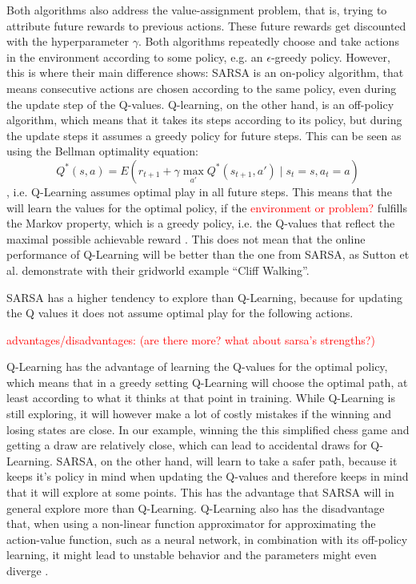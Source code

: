 \documentclass[conference]{IEEEtran}
\begin{document}
Both algorithms also address the value-assignment problem, that is, trying to attribute future rewards to previous actions. These future rewards get discounted with the hyperparameter $\gamma$. Both algorithms repeatedly choose and take actions in the environment according to some policy, e.g. an $\epsilon$-greedy policy. However, this is where their main difference shows: SARSA is an on-policy algorithm, that means consecutive actions are chosen according to the same policy, even during the update step of the Q-values. Q-learning, on the other hand, is an off-policy algorithm, which means that it takes its steps according to its policy, but during the update steps it assumes a greedy policy for future steps. This can be seen as using the Bellman optimality equation: $$Q^*(s,a) = E(r_{t+1} + \gamma \max_{a'} Q^*(s_{t+1}, a') \mid s_t=s, a_t=a)$$, i.e. Q-Learning assumes optimal play in all future steps. This means that the will learn the values for the optimal policy, if the \textcolor{red}{environment or problem?} fulfills the Markov property, which is a greedy policy, i.e. the Q-values that reflect the maximal possible achievable reward \cite{sutton2018}. This does not mean that the online performance of Q-Learning will be better than the one from SARSA, as Sutton et al. \cite{sutton2018} demonstrate with their gridworld example ``Cliff Walking''.

SARSA has a higher tendency to explore than Q-Learning, because for updating the Q values it does not assume optimal play for the following actions. 

\textcolor{red}{advantages/disadvantages: (are there more? what about sarsa's strengths?)}

Q-Learning has the advantage of learning the Q-values for the optimal policy, which means that in a greedy setting Q-Learning will choose the optimal path, at least according to what it thinks at that point in training. While Q-Learning is still exploring, it will however make a lot of costly mistakes if the winning and losing states are close. In our example, winning the this simplified chess game and getting a draw are relatively close, which can lead to accidental draws for Q-Learning. SARSA, on the other hand, will learn to take a safer path, because it keeps it's policy in mind when updating the Q-values and therefore keeps in mind that it will explore at some points. This has the advantage that SARSA will in general explore more than Q-Learning. Q-Learning also has the disadvantage that, when using a non-linear function approximator for approximating the action-value function, such as a neural network, in combination with its off-policy learning, it might lead to unstable behavior and the parameters might even diverge \cite{atari2013}.
\end{document}
